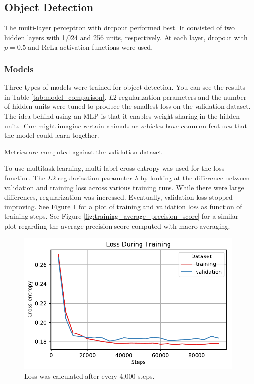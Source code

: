 \documentclass[letterpaper]{article}
\begin{document}
\subsection{Object Detection}

The multi-layer perceptron with dropout performed best. It consisted of two
hidden layers with 1,024 and 256 units, respectively. At each layer, dropout
with $p = 0.5$ and ReLu activation functions were used.

\subsubsection{Models}

Three types of models were trained for object detection. You can see the
results in Table \ref{tab:model_comparison}. $L2$-regularization parameters
and the number of hidden units were tuned to produce the smallest loss on the
validation dataset. The idea behind using an MLP is that it enables
weight-sharing in the hidden units. One might imagine certain animals or
vehicles have common features that the model could learn together.

\begin{table}[h]
  \centering
    
  \caption{Metrics are computed against the validation dataset.}
  \label{tab:model_comparison}    
\end{table}

To use multitask learning, multi-label cross entropy was used for the loss
function. The $L2$-regularization parameter $\lambda$ by looking at the
difference between validation and training loss across various training
runs. While there were large differences, regularization was
increased. Eventually, validation loss stopped improving. See Figure
\ref{fig:training_loss} for a plot of training and validation loss as function
of training steps. See Figure \ref{fig:training_average_precision_score} for a
similar plot regarding the average precision score computed with macro
averaging.

\begin{figure}
  \centering
  \includegraphics{object_detection/training_loss.pdf}
  \caption{Loss was calculated after every 4,000 steps.}
  \label{fig:training_loss}
\end{figure}
\end{document}
